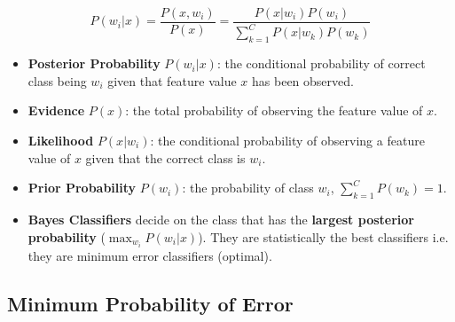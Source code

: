 \documentclass[letterpaper,10pt]{article}
\begin{document}
\begin{equation}
P(w_i|x)=\frac{P(x,w_i)}{P(x)}=\frac{P(x|w_i)P(w_i)}{\sum_{k=1}^{C}{P(x|w_k)P(w_k)}}
\end{equation}
\begin{itemize}
	\item \textbf{Posterior Probability} $P(w_i|x)$: the conditional probability of correct class being $w_i$ given that feature value $x$ has been observed.
	\item \textbf{Evidence} $P(x)$: the total probability of observing the feature value of $x$.
	\item \textbf{Likelihood} $P(x|w_i)$: the conditional probability of observing a feature value of $x$ given that the correct class is $w_i$.
	\item \textbf{Prior Probability} $P(w_i)$: the probability of class $w_i$, $\sum_{k=1}^{C}{P(w_k)}=1$.
	\item \textbf{Bayes Classifiers} decide on the class that has the \textbf{largest posterior probability} ($\max_{w_i}{P(w_i|x)}$). They are statistically the best classifiers i.e. they are minimum error classifiers (optimal).
\end{itemize}

\subsection{Minimum Probability of Error}
\end{document}
